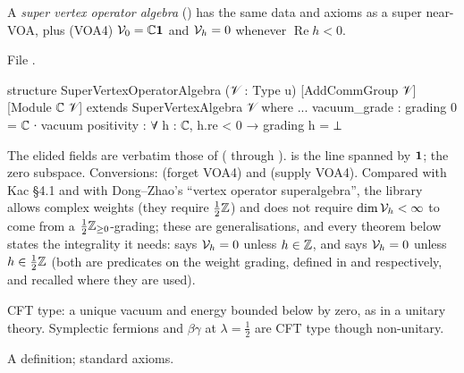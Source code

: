 \begin{definition}\label{l17:def:svoa}
A \emph{super vertex operator algebra} () has the same data and
axioms as a super near-VOA, plus (VOA4) $\mathcal{V}_0={\mathbb{C}}\mathbf{1}$ and $\mathcal{V}_h=0$ whenever
$\operatorname{Re}h<0$.
\end{definition}
\noindent File .
\begin{leancode}
structure SuperVertexOperatorAlgebra (𝒱 : Type u) [AddCommGroup 𝒱] [Module ℂ 𝒱]
    extends SuperVertexAlgebra 𝒱 where
...
  vacuum_grade : grading 0 = ℂ ∙ vacuum
  positivity : ∀ h : ℂ, h.re < 0 → grading h = ⊥
\end{leancode}
\begin{dictionary}
The elided fields are verbatim those of  ( through
).  is the line spanned by $\mathbf{1}$;  the zero
subspace. Conversions:  (forget VOA4) and
 (supply VOA4). Compared with Kac §4.1 and with Dong--Zhao's
``vertex operator superalgebra'', the library allows complex weights (they require
$\frac12{\mathbb{Z}}$) and does not require $\dim\mathcal{V}_h<\infty$ to come from a $\frac12{\mathbb{Z}}_{\ge0}$-grading;
these are generalisations, and every theorem below states the integrality it needs:
 says $\mathcal{V}_h=0$ unless $h\in{\mathbb{Z}}$, and  says
$\mathcal{V}_h=0$ unless $h\in\frac12{\mathbb{Z}}$ (both are predicates on the weight grading, defined in
 and  respectively, and recalled where they are used).
\end{dictionary}
\begin{physics}
CFT type: a unique vacuum and energy bounded below by zero, as in a unitary theory. Symplectic
fermions and $\beta\gamma$ at $\lambda=\frac12$ are CFT type though non-unitary.
\end{physics}
\begin{status}
A definition; standard axioms.
\end{status}

